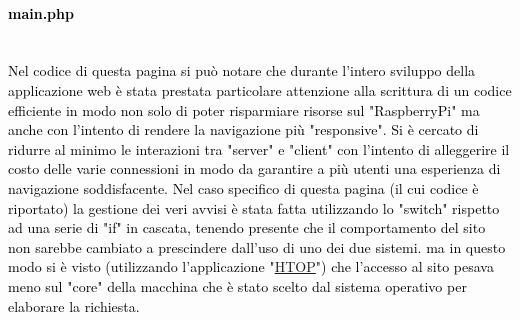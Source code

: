   \paragraph{\textcolor{black}{main.php}}\leavevmode\\
  
  \textcolor{black}{Nel codice di questa pagina si può notare che durante l'intero sviluppo della applicazione web è stata prestata particolare attenzione alla scrittura di un codice efficiente in modo non solo di poter risparmiare risorse sul "RaspberryPi" ma anche con l'intento di rendere la navigazione più "responsive". Si è cercato di ridurre al minimo le interazioni tra "server" e "client" con l'intento di alleggerire il costo delle varie connessioni in modo da garantire a più utenti una esperienza di navigazione soddisfacente. Nel caso specifico di questa pagina (il cui codice è riportato) la gestione dei veri avvisi è stata fatta utilizzando lo "switch" rispetto ad una serie di "if" in cascata, tenendo presente che il comportamento del sito non sarebbe cambiato a prescindere dall'uso di uno dei due sistemi. ma in questo modo si è visto (utilizzando l'applicazione "\href{https://htop.dev/}{HTOP}") che l'accesso al sito pesava meno sul "core" della macchina che è stato scelto dal sistema operativo per elaborare la richiesta.}\\
  
